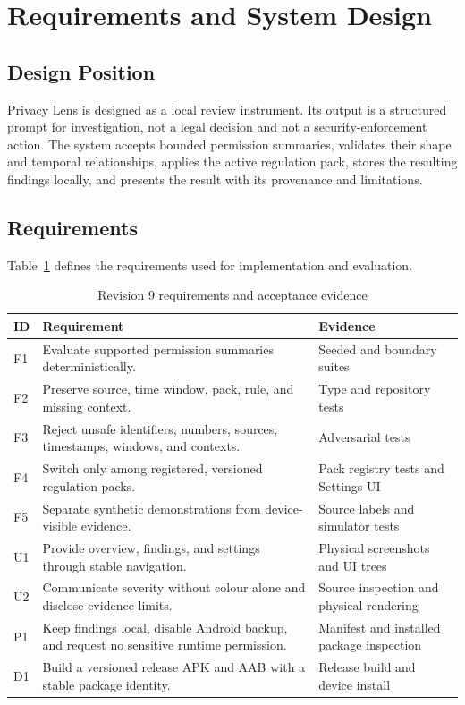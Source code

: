 \section{Requirements and System Design}

\subsection{Design Position}

Privacy Lens is designed as a local review instrument. Its output is a structured prompt for investigation, not a legal decision and not a security-enforcement action. The system accepts bounded permission summaries, validates their shape and temporal relationships, applies the active regulation pack, stores the resulting findings locally, and presents the result with its provenance and limitations.

\subsection{Requirements}

Table~\ref{tab:r9-requirements} defines the requirements used for implementation and evaluation.

\begin{table}[H]
\centering
\small
\caption{Revision 9 requirements and acceptance evidence}
\label{tab:r9-requirements}
\begin{tabular}{p{}p{}p{}}
\toprule
ID & Requirement & Evidence \\
\midrule
F1 & Evaluate supported permission summaries deterministically. & Seeded and boundary suites \\
F2 & Preserve source, time window, pack, rule, and missing context. & Type and repository tests \\
F3 & Reject unsafe identifiers, numbers, sources, timestamps, windows, and contexts. & Adversarial tests \\
F4 & Switch only among registered, versioned regulation packs. & Pack registry tests and Settings UI \\
F5 & Separate synthetic demonstrations from device-visible evidence. & Source labels and simulator tests \\
U1 & Provide overview, findings, and settings through stable navigation. & Physical screenshots and UI trees \\
U2 & Communicate severity without colour alone and disclose evidence limits. & Source inspection and physical rendering \\
P1 & Keep findings local, disable Android backup, and request no sensitive runtime permission. & Manifest and installed package inspection \\
D1 & Build a versioned release APK and AAB with a stable package identity. & Release build and device install \\
\bottomrule
\end{tabular}
\end{table}

